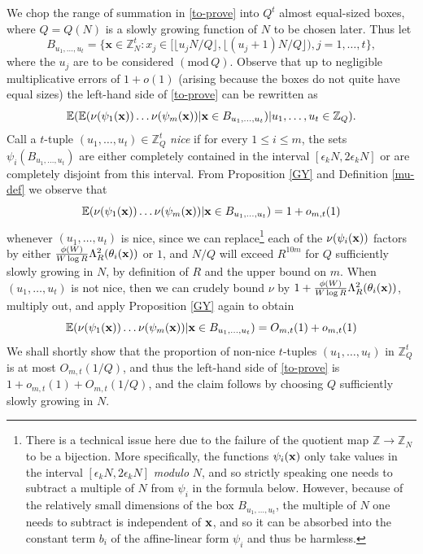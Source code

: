 \documentclass[12pt,a4paper,reqno]{amsart}
\numberwithin{equation}{section}
\theoremstyle{plain}
\theoremstyle{definition}
\renewcommand{\leq}{\leqslant}
\newcommand{\md}[1]{\ensuremath{(\mbox{mod}\, #1)}}
\def\Z{{\mathbb Z}}
\def\E{{\mathbb E}}
\def\x{{\bf x}}
\def\vs{\vspace{11pt}}
\def\ni{\noindent}
\def\emph#1{{\it #1}}
\begin{document}
\ni We chop the range of summation in \eqref{to-prove} into $Q^t$ almost equal-sized boxes, where $Q = Q(N)$ is a slowly growing function of $N$ to be chosen later. Thus let 
\[ B_{u_1,\dots,u_t} = \{ \mathbf{x} \in \Z_N^t : x_j \in [\lfloor u_jN/Q\rfloor,\lfloor(u_j + 1)N/Q\rfloor), j = 1,\dots,t\},\] where the $u_j$ are to be considered $\md{Q}$. Observe that up to negligible multiplicative errors of $1 + o(1)$ (arising because the boxes do not quite have equal sizes) the left-hand side of \eqref{to-prove} can be rewritten as
$$ \E( \E( \nu(\psi_1(\x)) \ldots \nu(\psi_m(\x)) | \x \in B_{u_1,\ldots,u_t} ) | u_1, \ldots, u_t \in \Z_Q ).$$
Call a $t$-tuple $(u_1,\dots,u_t) \in \Z_Q^t$ \textit{nice} if for every $1 \leq i \leq m$,
the sets $\psi_i(B_{u_1,\ldots,u_t})$ are either completely contained in the interval $[\epsilon_k N, 2\epsilon_k N]$ or are completely
disjoint from this interval.  From Proposition \ref{GY} and Definition \ref{mu-def} we observe that
$$ \E( \nu(\psi_1(\x)) \ldots \nu(\psi_m(\x)) | \x \in B_{u_1,\ldots,u_t} ) = 1 + o_{m,t}(1)$$
whenever $(u_1,\ldots,u_t)$ is nice, since we can replace\footnote{There is a technical issue here due to the failure of the quotient map $\Z \to \Z_N$ to be a bijection.  More specifically, the functions $\psi_i(\x)$ only take values in the interval $[\epsilon_k N, 2\epsilon_k N]$ \emph{modulo} $N$, and so strictly speaking one needs to subtract a multiple of $N$ from $\psi_i$ in the formula below.  However, because of the relatively small dimensions of the box $B_{u_1,\ldots,u_t}$, the multiple of $N$ one needs to subtract is independent of $\x$, and so it can be absorbed into the constant term $b_i$ of the affine-linear form $\psi_i$ and thus be harmless.}
 each of the $\nu(\psi_i(\x))$ factors by either
$\frac{\phi(W)}{W \log R} \Lambda_R^2(\theta_i(\x))$ or $1$, and $N/Q$ will exceed $R^{10m}$ for $Q$ sufficiently slowly growing in $N$, by definition of $R$ and the upper bound on $m$.  
When $(u_1,\ldots,u_t)$ is not nice, then we can crudely
bound $\nu$ by $1 + \frac{\phi(W)}{W \log R} \Lambda_R^2(\theta_i(\x))$, multiply out, and apply Proposition \ref{GY} again to obtain
$$ \E( \nu(\psi_1(\x)) \ldots \nu(\psi_m(\x)) | \x \in B_{u_1,\ldots,u_t} ) = O_{m,t}(1) + o_{m,t}(1)$$
We shall shortly show that the proportion of non-nice $t$-tuples $(u_1,\ldots,u_t)$ in $\Z_Q^t$ is at 
most $O_{m,t}(1/Q)$, and thus the left-hand side of \eqref{to-prove} is $1 + o_{m,t}(1) + O_{m,t}(1/Q)$, and the claim follows
by choosing $Q$ sufficiently slowly growing in $N$.\vs
\end{document}
